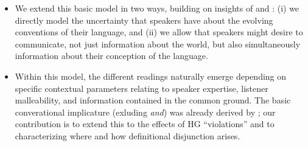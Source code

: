 \documentclass[12pt]{article}
\newcommand{\word}[1]{\emph{#1}}
\begin{document}
\begin{itemize}
\item
We extend this basic model in two ways, building on insights of
\citet{Bergen:Goodman:Levy:2012} and \citet{Smith:Goodman:Frank:2013}:
(i) we directly model the uncertainty that speakers have about the
evolving conventions of their language, and (ii) we allow that
speakers might desire to communicate, not just information about the
world, but also simultaneously information about their conception of
the language. 

\item
Within this model, the different readings naturally emerge depending
on specific contextual parameters relating to speaker expertise,
listener malleability, and information contained in the common ground.
The basic converational implicature (exluding \word{and}) was already
derived by \citealt{Bergen:Goodman:Levy:2012}; our contribution is to
extend this to the effects of HG ``violations'' and to characterizing
where and how definitional disjunction arises.

\end{itemize}

\renewcommand{\bibsection}{\paragraph{References}}


\end{document}
